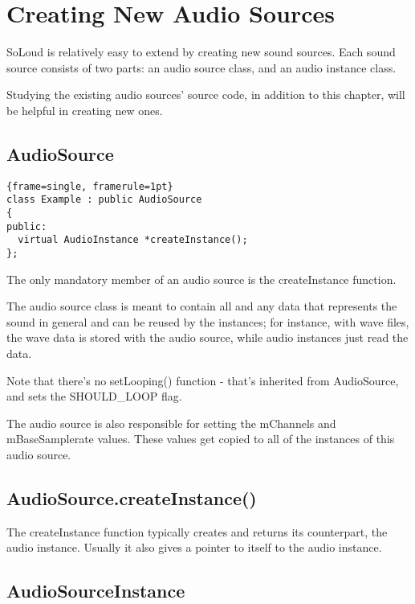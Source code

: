 
\chapter{Creating New Audio Sources}

SoLoud is relatively easy to extend by creating new sound sources. Each sound source consists of two parts: an audio source class, and an audio instance class.

Studying the existing audio sources' source code, in addition to this chapter, will be helpful in creating new ones.

\section{AudioSource}

\begin{lstlisting}{frame=single, framerule=1pt}
class Example : public AudioSource
{
public:
  virtual AudioInstance *createInstance();
};
\end{lstlisting}

The only mandatory member of an audio source is the createInstance function.

The audio source class is meant to contain all and any data that represents the sound in general and can be reused by the instances; for instance, with wave files, the wave data is stored with the audio source, while audio instances just read the data.

Note that there's no setLooping() function - that's inherited from AudioSource, and sets the SHOULD\_LOOP flag.

The audio source is also responsible for setting the mChannels and mBaseSamplerate values. These values get copied to all of the instances of this audio source.

\section{AudioSource.createInstance()}

The createInstance function typically creates and returns its counterpart, the audio instance. Usually it also gives a pointer to itself to the audio instance.

\section{AudioSourceInstance}

